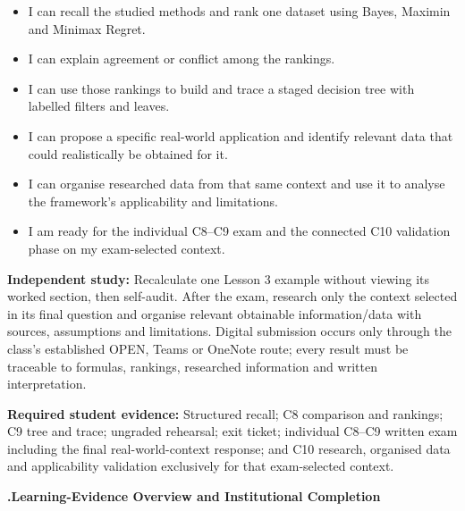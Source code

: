 \documentclass[10pt,letterpaper]{article}
\newcommand{\sectionbar}[1]{%
	\begin{tcolorbox}[
		enhanced,
		colback=sectionblue,
		colframe=sectionblue,
		boxrule=0pt,
		sharp corners,
		left=0.32in,
		right=0.08in,
		top=3.5pt,
		bottom=3.5pt,
		before skip=0pt,
		after skip=0pt,
		borderline north={1.15pt}{0pt}{black},
		borderline south={1.15pt}{0pt}{black}
		]
		\color{white}\bfseries\fontsize{12}{14}\selectfont #1
	\end{tcolorbox}%
}
\newcommand{\labelled}[2]{\textbf{#1:} #2\par}
\newcommand{\partheading}[1]{\Needspace{6\baselineskip}\par\vspace{5pt}{\bfseries #1\par}\vspace{1pt}}
\newcommand{\evidenceitem}[1]{\item[$\square$] #1}
\begin{document}
\begin{bluebox}
		\partheading{Exit Ticket N3}
		\begin{itemize}[leftmargin=1.8em,itemsep=1pt]
			\evidenceitem{I can recall the studied methods and rank one dataset using Bayes, Maximin and Minimax Regret.}
			\evidenceitem{I can explain agreement or conflict among the rankings.}
			\evidenceitem{I can use those rankings to build and trace a staged decision tree with labelled filters and leaves.}
			\evidenceitem{I can propose a specific real-world application and identify relevant data that could realistically be obtained for it.}
			\evidenceitem{I can organise researched data from that same context and use it to analyse the framework's applicability and limitations.}
			\evidenceitem{I am ready for the individual C8--C9 exam and the connected C10 validation phase on my exam-selected context.}
		\end{itemize}
		
		\labelled{Independent study}{Recalculate one Lesson 3 example without viewing its worked section, then self-audit. After the exam, research only the context selected in its final question and organise relevant obtainable information/data with sources, assumptions and limitations. Digital submission occurs only through the class's established OPEN, Teams or OneNote route; every result must be traceable to formulas, rankings, researched information and written interpretation.}
		\labelled{Required student evidence}{Structured recall; C8 comparison and rankings; C9 tree and trace; ungraded rehearsal; exit ticket; individual C8--C9 written exam including the final real-world-context response; and C10 research, organised data and applicability validation exclusively for that exam-selected context.}
	\end{bluebox}
	
	\vspace{0.18in}
	
	\newpage
	\sectionbar{6.\quad Learning-Evidence Overview and Institutional Completion}
	
\end{document}
